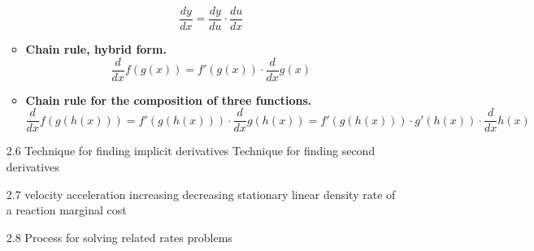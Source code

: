 \documentclass{article}
\begin{document}
\begin{itemize}
\begin{itemize}
\begin{displaymath}
      \frac{dy}{dx} = \frac{dy}{du} \cdot \frac{du}{dx}
    \end{displaymath}
  \item \textbf{Chain rule, hybrid form.}
    \begin{displaymath}
      \frac{d}{dx} f(g(x)) = f'(g(x)) \cdot \frac{d}{dx} g(x)
    \end{displaymath}
  \item \textbf{Chain rule for the composition of three functions.}
    \begin{displaymath}
      \frac{d}{dx} f(g(h(x)))
      = f'(g(h(x))) \cdot \frac{d}{dx} g(h(x))
      = f'(g(h(x))) \cdot g'(h(x)) \cdot \frac{d}{dx} h(x)
    \end{displaymath}
  \end{itemize} %
\item[2.6] %
  Technique for finding implicit derivatives
  Technique for finding second derivatives
\item[2.7] %
  velocity
  acceleration
  increasing
  decreasing
  stationary
  linear density
  rate of a reaction
  marginal cost
\item[2.8] %
  Process for solving related rates problems
\end{itemize}
\end{document}
